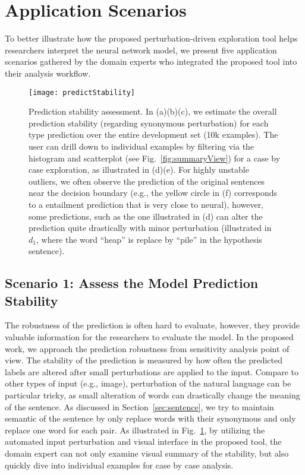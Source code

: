 \section{Application Scenarios}
\label{sec:caseStudy}
To better illustrate how the proposed perturbation-driven exploration tool helps researchers interpret the neural network model, we present five application scenarios gathered by the domain experts who integrated the proposed tool into their analysis workflow.

\begin{figure}[htbp]
\centering
 \texttt{[image: predictStability]}
 \caption{
Prediction stability assessment. In (a)(b)(c), we estimate the overall prediction stability (regarding synonymous perturbation) for each type prediction over the entire development set (10k examples). The user can drill down to individual examples by filtering via the histogram and scatterplot (see Fig.~\ref{fig:summaryView}) for a case by case exploration, as illustrated in (d)(e). For highly unstable outliers, we often observe the prediction of the original sentences near the decision boundary (e.g., the yellow circle in (f) corresponds to a entailment prediction that is very close to neural), however, some predictions, such as the one illustrated in (d) can alter the prediction quite drastically with minor perturbation (illustrated in $d_1$, where the word ``heap'' is replace by ``pile'' in the hypothesis sentence).
%
}
\label{fig:predictStability}
\end{figure}

\subsection{Scenario 1: Assess the Model Prediction Stability}
The robustness of the prediction is often hard to evaluate, however, they provide valuable information for the researchers to evaluate the model.
%
In the proposed work, we approach the prediction robustness from sensitivity analysis point of view. The stability of the prediction is measured by how often the predicted labels are altered after small perturbations are applied to the input. 
%
Compare to other types of input (e.g., image), perturbation of the natural language can be particular tricky, as small alteration of words can drastically change the meaning of the sentence. As discussed in Section~\ref{sec:sentence}, we try to maintain semantic of the sentence by only replace words with their synonymous and only replace one word for each pair.
%
As illustrated in Fig.~\ref{fig:predictStability}, by utilizing the automated input perturbation and visual interface in the proposed tool, the domain expert can not only examine visual summary of the stability, but also quickly dive into individual examples for case by case analysis.%

